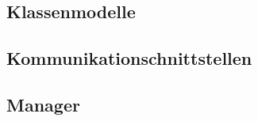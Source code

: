 \documentclass[11pt,a4paper]{article}
\begin{document}
\subsection{Klassenmodelle}		

\subsection{Kommunikationschnittstellen}
	
\subsection{Manager}	

%
%
%
%
\end{document}
